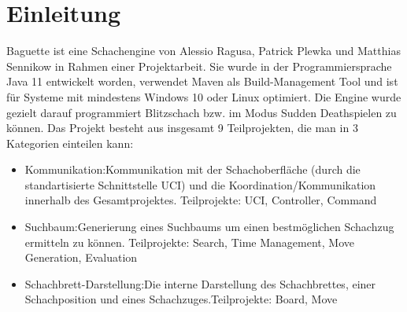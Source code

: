 \section{Einleitung}
Baguette ist eine Schachengine von Alessio Ragusa, Patrick Plewka und Matthias Sennikow in Rahmen einer Projektarbeit.
Sie wurde in der Programmiersprache Java 11 entwickelt worden, verwendet Maven als Build-Management Tool und ist für Systeme mit mindestens Windows 10 oder Linux optimiert. \newline
Die Engine wurde gezielt darauf programmiert Blitzschach bzw. im Modus Sudden Death spielen zu k\"onnen.\newline
Das Projekt besteht aus insgesamt 9 Teilprojekten, die man in 3 Kategorien einteilen kann:
\begin{itemize}
    \item{Kommunikation:\newline Kommunikation mit der Schachoberfl\"ache (durch die standartisierte Schnittstelle UCI) und die Koordination/Kommunikation innerhalb des Gesamtprojektes.
        \newline Teilprojekte: UCI, Controller, Command}
    \item{Suchbaum:\newline Generierung eines Suchbaums um einen bestmöglichen Schachzug ermitteln zu können. \newline Teilprojekte:  Search, Time Management, Move Generation, Evaluation}
    \item{Schachbrett-Darstellung:\newline Die interne Darstellung des Schachbrettes, einer Schachposition und eines Schachzuges.\newline Teilprojekte: Board, Move}
\end{itemize}

